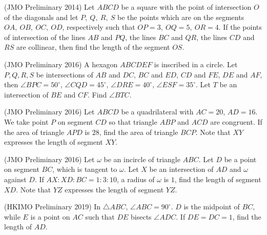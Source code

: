 \documentclass[11pt]{scrartcl}
\begin{document}
    \begin{soalbaru}
    (JMO Preliminary 2014) Let $ABCD$ be a square with the point of intersection $O$ of the diagonals and let $P,\ Q,\ R,\ S$ be the points which are on the segments $OA,\ OB,\ OC,\ OD$, respectively such that $OP=3,\ OQ=5,\ OR=4$. If the points of intersection of the lines $AB$ and $PQ$, the lines $BC$ and $QR$, the lines $CD$ and $RS$ are collinear, then find the length of the segment $OS$.
    \end{soalbaru}
    
    \begin{soalbaru}
    (JMO Preliminary 2016) A hexagon $ABCDEF$ is inscribed in a circle. Let $P, Q, R, S$ be intersections of $AB$ and $DC$, $BC$ and $ED$, $CD$ and $FE$, $DE$ and $AF$, then $\angle BPC=50^{\circ}$, $\angle CQD=45^{\circ}$, $\angle DRE=40^{\circ}$, $\angle ESF=35^{\circ}$. Let $T$ be an intersection of $BE$ and $CF$. Find $\angle BTC$.
    \end{soalbaru}
    
    \begin{soalbaru}
    (JMO Preliminary 2016) Let $ABCD$ be a quadrilateral with $AC=20$, $AD=16$. We take point $P$ on segment $CD$ so that triangle $ABP$ and $ACD$ are congruent. If the area of triangle $APD$ is $28$, find the area of triangle $BCP$. Note that $XY$ expresses the length of segment $XY$.
    \end{soalbaru}
    
    \begin{soalbaru}
    (JMO Preliminary 2016) Let $\omega$ be an incircle of triangle $ABC$. Let $D$ be a point on segment $BC$, which is tangent to $\omega$. Let $X$ be an intersection of $AD$ and $\omega$ against $D$. If $AX : XD : BC = 1 : 3 : 10$, a radius of $\omega$ is $1$, find the length of segment $XD$. Note that $YZ$ expresses the length of segment $YZ$.
    \end{soalbaru}
    
    \begin{soalbaru}
    (HKIMO Preliminary 2019) In $\triangle ABC$, $\angle ABC = 90^\circ$. $D$ is the midpoint of $BC$, while $E$ is a point on $AC$ such that $DE$ bisects $\angle ADC$. If $DE=DC=1$, find the length of $AD$. 
    \end{soalbaru}
    
\end{document}
